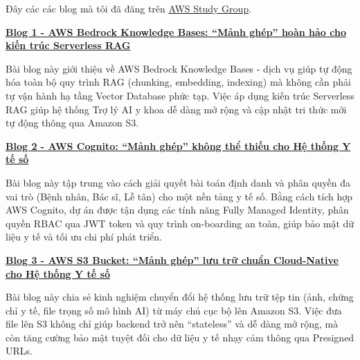 Đây các các blog mà tôi đã đăng trên
\href{https://www.facebook.com/groups/awsstudygroupfcj}{AWS Study
Group}.

\vspace{0.5em}\noindent\textbf{\texorpdfstring{\href{3.1-Blog1/}{Blog 1 - AWS Bedrock
Knowledge Bases: ``Mảnh ghép'' hoàn hảo cho kiến trúc Serverless
RAG}}{Blog 1 - AWS Bedrock Knowledge Bases: ``Mảnh ghép'' hoàn hảo cho kiến trúc Serverless RAG}}

Bài blog này giới thiệu về AWS Bedrock Knowledge Bases - dịch vụ giúp tự
động hóa toàn bộ quy trình RAG (chunking, embedding, indexing) mà không
cần phải tự vận hành hạ tầng Vector Database phức tạp. Việc áp dụng kiến
trúc Serverless RAG giúp hệ thống Trợ lý AI y khoa dễ dàng mở rộng và
cập nhật tri thức mới tự động thông qua Amazon S3.

\vspace{0.5em}\noindent\textbf{\texorpdfstring{\href{3.2-Blog2/}{Blog 2 - AWS Cognito:
``Mảnh ghép'' không thể thiếu cho Hệ thống Y tế
số}}{Blog 2 - AWS Cognito: ``Mảnh ghép'' không thể thiếu cho Hệ thống Y tế số}}

Bài blog này tập trung vào cách giải quyết bài toán định danh và phân
quyền đa vai trò (Bệnh nhân, Bác sĩ, Lễ tân) cho một nền tảng y tế số.
Bằng cách tích hợp AWS Cognito, dự án được tận dụng các tính năng Fully
Managed Identity, phân quyền RBAC qua JWT token và quy trình on-boarding
an toàn, giúp bảo mật dữ liệu y tế và tối ưu chi phí phát triển.

\vspace{0.5em}\noindent\textbf{\texorpdfstring{\href{3.3-Blog3/}{Blog 3 - AWS S3 Bucket:
``Mảnh ghép'' lưu trữ chuẩn Cloud-Native cho Hệ thống Y tế
số}}{Blog 3 - AWS S3 Bucket: ``Mảnh ghép'' lưu trữ chuẩn Cloud-Native cho Hệ thống Y tế số}}

Bài blog này chia sẻ kinh nghiệm chuyển đổi hệ thống lưu trữ tệp tin
(ảnh, chứng chỉ y tế, file trọng số mô hình AI) từ máy chủ cục bộ lên
Amazon S3. Việc đưa file lên S3 không chỉ giúp backend trở nên
``stateless'' và dễ dàng mở rộng, mà còn tăng cường bảo mật tuyệt đối
cho dữ liệu y tế nhạy cảm thông qua Presigned URLs.

